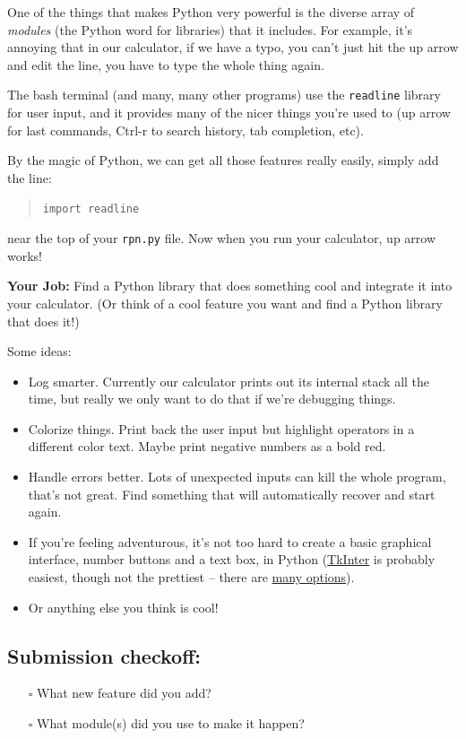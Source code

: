 \documentclass{article}
\begin{document}
One of the things that makes Python very powerful is the diverse array of
\emph{modules} (the Python word for libraries) that it includes. For example,
it's annoying that in our calculator, if we have a typo, you can't just hit
the up arrow and edit the line, you have to type the whole thing again.

The bash terminal (and many, many other programs) use the \texttt{readline}
library for user input, and it provides many of the nicer things you're used
to (up arrow for last commands, Ctrl-r to search history, tab completion, etc).

By the magic of Python, we can get all those features really easily, simply
add the line:
\begin{quote}
  \texttt{import readline}
\end{quote}
near the top of your \texttt{rpn.py} file. Now when you run your calculator,
up arrow works!

\textbf{Your Job:} Find a Python library that does something cool and
integrate it into your calculator. (Or think of a cool feature you want and
find a Python library that does it!)

Some ideas:
\begin{itemize}
  \item Log smarter. Currently our calculator prints out its internal stack
    all the time, but really we only want to do that if we're debugging
    things.
  \item Colorize things. Print back the user input but highlight operators in
    a different color text. Maybe print negative numbers as a bold red.
  \item Handle errors better. Lots of unexpected inputs can kill the whole
    program, that's not great. Find something that will automatically recover
    and start again.
  \item If you're feeling adventurous, it's not too hard to create a basic
    graphical interface, number buttons and a text box, in Python
    (\href{https://wiki.python.org/moin/TkInter}{TkInter} is probably easiest,
    though not the prettiest -- there are
    \href{https://wiki.python.org/moin/GuiProgramming}{many options}).
  \item Or anything else you think is cool!
\end{itemize}

\subsection*{Submission checkoff:}
\begin{itemize}
  \item[$\square$] What new feature did you add?
  \item[$\square$] What module(s) did you use to make it happen?
\end{itemize}
\end{document}
